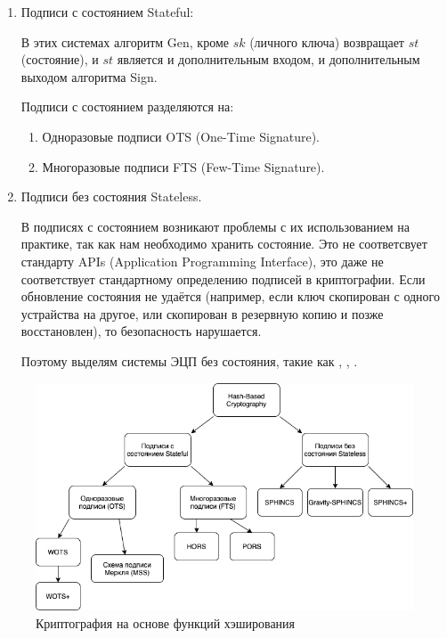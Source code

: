 \documentclass[a4paper, 14pt]{extarticle}
\begin{document}
\begin{enumerate}
    \item Подписи с состоянием Stateful:

    В этих системах алгоритм Gen, кроме $sk$ (личного ключа) возвращает $st$ (состояние), и $st$ является и дополнительным входом, и дополнительным выходом алгоритма Sign.

    Подписи с состоянием разделяются на:

    \begin{enumerate}
        \item Одноразовые подписи OTS (One-Time Signature).
        \item Многоразовые подписи FTS (Few-Time Signature).
    \end{enumerate}

    \item Подписи без состояния Stateless.

    В подписях с состоянием возникают проблемы с их использованием на практике, так как нам необходимо хранить состояние. Это не соответсвует стандарту APIs (Application Programming Interface), это даже не соответствует стандартному определению подписей в криптографии. Если обновление состояния не удаётся (например, если ключ скопирован с одного устрайства на другое, или скопирован в резервную копию и позже восстановлен), то безопасность нарушается.

    Поэтому выделям системы ЭЦП без состояния, такие как , , .
\end{enumerate}

\begin{figure}[h]
    \centering
    \includegraphics[scale=0.72]{HBC_structure.png}
    \caption{Криптография на основе функций хэширования}
    \label{fig:hbc_structure}
\end{figure}
\end{document}
